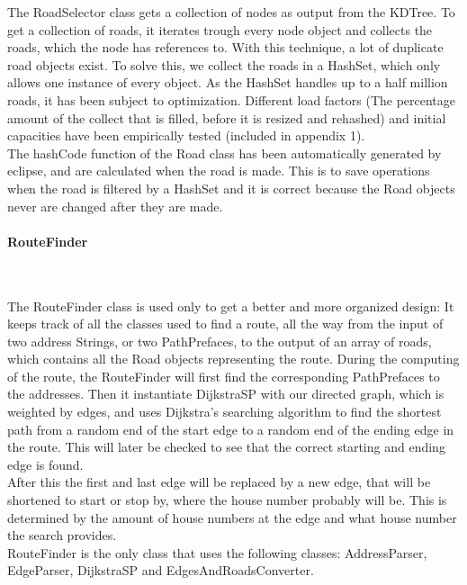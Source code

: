 \documentclass[a4paper,10pt,titlepage]{article}
\begin{document}
The RoadSelector class gets a collection of nodes as output from the KDTree. To get a collection of roads, it iterates trough every node object and collects the roads, which the node has references to. With this technique, a lot of duplicate road objects exist. To solve this, we collect the roads in a HashSet, which only allows one instance of every object. As the HashSet handles up to a half million roads, it has been subject to optimization. Different load factors (The percentage amount of the collect that is filled, before it is resized and rehashed) and initial capacities have been empirically tested (included in appendix 1).\\

The hashCode function of the Road class has been automatically generated by eclipse, and are calculated when the road is made. This is to save operations when the road is filtered by a HashSet and it is correct because the Road objects never are changed after they are made.
				
				\paragraph{RouteFinder}\mbox{}\
				
The RouteFinder class is used only to get a better and more organized design: It keeps track of all the classes used to find a route, all the way from the input of two address Strings, or two PathPrefaces, to the output of an array of roads, which contains all the Road objects representing the route. During the computing of the route, the RouteFinder will first find the corresponding PathPrefaces to the addresses. Then it instantiate DijkstraSP with our directed graph, which is weighted by edges, and uses Dijkstra’s searching algorithm to find the shortest path from a random end of the start edge to a random end of the ending edge in the route. This will later be checked to see that the correct starting and ending edge is found.\\
After this the first and last edge will be replaced by a new edge, that will be shortened to start or stop by, where the house number probably will be. This is determined by the amount of house numbers at the edge and what house number the search provides.\\
RouteFinder is the only class that uses the following classes: AddressParser,  EdgeParser, DijkstraSP and EdgesAndRoadsConverter.\\
\end{document}
